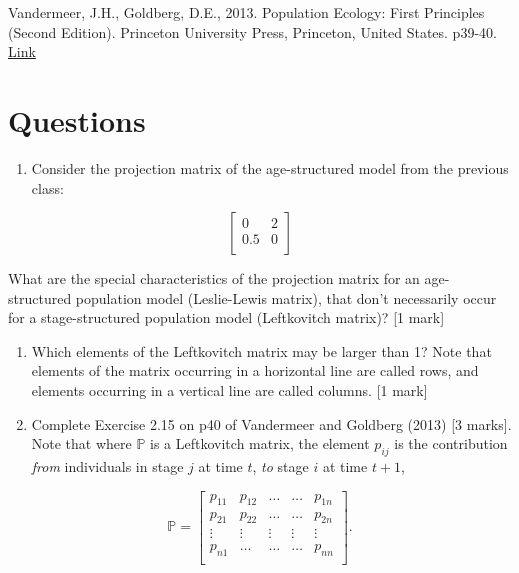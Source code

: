 \documentclass[]{book}
\providecommand{\tightlist}{%
  \setlength{\itemsep}{0pt}\setlength{\parskip}{0pt}}
\begin{document}
Vandermeer, J.H., Goldberg, D.E., 2013. Population Ecology: First
Principles (Second Edition). Princeton University Press, Princeton,
United States. p39-40.
\href{https://ebookcentral-proquest-com.qe2a-proxy.mun.ca/lib/mun/detail.action?docID=1205619}{Link}

\section{Questions}\label{questions}

\begin{enumerate}
\def\labelenumi{\arabic{enumi}.}
\tightlist
\item
  Consider the projection matrix of the age-structured model from the
  previous class:
\end{enumerate}

\begin{equation}
\left[
\begin{array}{cc}
0 & 2\\
0.5 & 0\\
\end{array}
\right]
\end{equation}

What are the special characteristics of the projection matrix for an
age-structured population model (Leslie-Lewis matrix), that don't
necessarily occur for a stage-structured population model (Leftkovitch
matrix)? {[}1 mark{]}

\begin{enumerate}
\def\labelenumi{\arabic{enumi}.}
\setcounter{enumi}{1}
\item
  Which elements of the Leftkovitch matrix may be larger than 1? Note
  that elements of the matrix occurring in a horizontal line are called
  rows, and elements occurring in a vertical line are called columns.
  {[}1 mark{]}
\item
  Complete Exercise 2.15 on p40 of Vandermeer and Goldberg (2013) {[}3
  marks{]}. Note that where \(\mathbb{P}\) is a Leftkovitch matrix, the
  element \(p_{ij}\) is the contribution \emph{from} individuals in
  stage \(j\) at time \(t\), \emph{to} stage \(i\) at time \(t+1\),
\end{enumerate}

\begin{equation}
\mathbb{P} = 
\left[
\begin{array}{ccccc}
p_{11} & p_{12} & \dots & \dots & p_{1n} \\
p_{21} & p_{22} & \dots & \dots & p_{2n} \\
\vdots & \vdots & \vdots & \vdots & \vdots \\
p_{n1} & \dots & \dots & \dots & p_{nn} \\
\end{array}
\right].
\end{equation}
\end{document}
